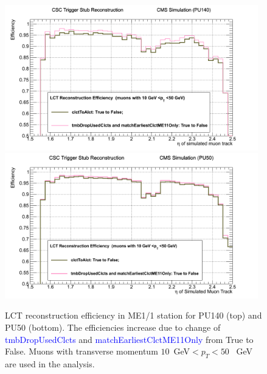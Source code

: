 \begin{figure}[h!]
\includegraphics[width=0.98\textwidth]{figures/PU140_Improv_from6_to_7.png}
\includegraphics[width=0.98\textwidth]{figures/PU50_Improv_from6_to_7.png}
\caption{LCT reconstruction efficiency in ME1/1 station for PU140 (top) and PU50 (bottom). The efficiencies increase due to change of \textcolor{blue}{tmbDropUsedClcts} and \textcolor{blue}{matchEarliestClctME11Only} from True to False. Muons with transverse momentum $10$~GeV$<p_T<50$~ GeV are used in the analysis.}
\label{fig:From6to7}
\end{figure}
